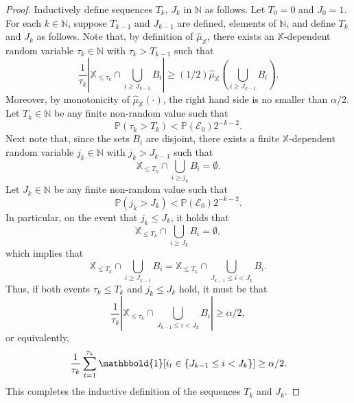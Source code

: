 \documentclass[aos]{imsart}
\theoremstyle{plain}
\theoremstyle{remark}
\newcommand{\Xbb}{\mathbb{X}}
\newcommand{\1}{\mathbbm{1}}%
\newcommand{\Event}{\mathscr{E}}
\renewcommand{\P}{\mathbb P}
\newcommand{\nats}{\mathbb{N}}
\newcommand{\ind}{\mathbbold{1}}
\newcommand{\ProcX}{\mathbb{X}}
\begin{document}
\begin{proof}
Inductively define sequences $T_k$, $J_k$ in $\nats$ as follows.
Let $T_0 = 0$ and $J_0 = 1$.
For each $k \in \nats$, 
suppose $T_{k-1}$ and $J_{k-1}$ are defined, elements of $\nats$,
and define $T_k$ and $J_k$ as follows.
Note that, by definition of $\hat{\mu}_{\ProcX}$, 
there exists an $\ProcX$-dependent random variable 
$\tau_k \in \nats$ with $\tau_k > T_{k-1}$
such that 
\begin{equation*}
\frac{1}{\tau_k} \left| \Xbb_{\leq \tau_k} \cap \bigcup_{i \geq J_{k-1}} B_i \right| 
\geq (1/2)\hat{\mu}_{\ProcX}\!\left( \bigcup_{i \geq J_{k-1}} B_i \right).
\end{equation*}
Moreover, by monotonicity of $\hat{\mu}_{\ProcX}(\cdot)$, the 
right hand side is no smaller than $\alpha/2$.
Let $T_{k} \in \nats$ be any finite non-random value such that 
\begin{equation*}
\P\!\left( \tau_k > T_k \right) < \P(\Event_0) 2^{-k-2}.
\end{equation*}
Next note that, since the sets $B_i$ are disjoint, 
there exists a finite $\ProcX$-dependent random variable $j_k \in \nats$ 
with $j_k > J_{k-1}$ such that 
\begin{equation*}
\Xbb_{\leq T_{k}} \cap \bigcup_{i \geq j_k} B_i = \emptyset. 
\end{equation*}
Let $J_k \in \nats$ be any finite non-random value such that
\begin{equation*}
\P\!\left( j_k > J_k \right) < \P(\Event_0) 2^{-k-2}.
\end{equation*}
In particular, on the event that $j_k \leq J_k$, it holds that
\begin{equation*}
\Xbb_{\leq T_{k}} \cap \bigcup_{i \geq J_k} B_i = \emptyset, 
\end{equation*}
which implies that 
\begin{equation*}
\Xbb_{\leq T_{k}} \cap \bigcup_{i \geq J_{k-1}} B_i 
= \Xbb_{\leq T_{k}} \cap \bigcup_{J_{k-1} \leq i < J_{k}} B_i.
\end{equation*}
Thus, if both events $\tau_k \leq T_k$ and $j_k \leq J_k$ hold, 
it must be that 
\begin{equation*}
\frac{1}{\tau_k} \left| \Xbb_{\leq \tau_k} \cap \bigcup_{J_{k-1} \leq i < J_{k}} B_i \right| 
\geq \alpha/2,
\end{equation*}
or equivalently, 
\begin{equation}
\label{eqn:tauk-Jk-inclusion}
\frac{1}{\tau_k} \sum_{t=1}^{\tau_k} \ind[ i_t \in \{J_{k-1} \leq i < J_{k}\} ] \geq \alpha/2.
\end{equation}
This completes the inductive definition of the sequences $T_k$ and $J_k$.


\end{proof}
\end{document}
